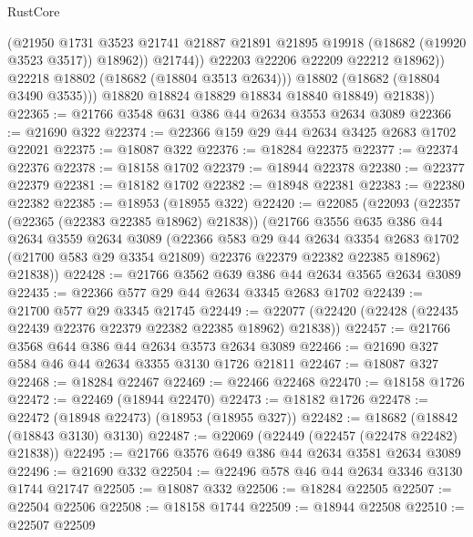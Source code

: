 \begin{lexlean}{RustCore}
\begin{coremodule}
                        (@21950
                          @1731
                          @3523
                          @21741
                          @21887
                          @21891
                          @21895
                          @19918
                          (@18682 (@19920 @3523 @3517))
                          @18962))
                      @21744))
                  @22203
                  @22206
                  @22209
                  @22212
                  @18962))
              @22218
              @18802
              (@18682 (@18804 @3513 @2634)))
            @18802
            (@18682 (@18804 @3490 @3535)))
          @18820
          @18824
          @18829
          @18834
          @18840
          @18849)
        @21838))
@22365 := @21766 @3548 @631 @386 @44 @2634 @3553 @2634 @3089
@22366 := @21690 @322
@22374 := @22366 @159 @29 @44 @2634 @3425 @2683 @1702 @22021
@22375 := @18087 @322
@22376 := @18284 @22375
@22377 := @22374 @22376
@22378 := @18158 @1702
@22379 := @18944 @22378
@22380 := @22377 @22379
@22381 := @18182 @1702
@22382 := @18948 @22381
@22383 := @22380 @22382
@22385 := @18953 (@18955 @322)
@22420 := @22085
    (@22093
      (@22357 (@22365 (@22383 @22385 @18962) @21838))
      (@21766
        @3556
        @635
        @386
        @44
        @2634
        @3559
        @2634
        @3089
        (@22366
          @583
          @29
          @44
          @2634
          @3354
          @2683
          @1702
          (@21700 @583 @29 @3354 @21809)
          @22376
          @22379
          @22382
          @22385
          @18962)
        @21838))
@22428 := @21766 @3562 @639 @386 @44 @2634 @3565 @2634 @3089
@22435 := @22366 @577 @29 @44 @2634 @3345 @2683 @1702
@22439 := @21700 @577 @29 @3345 @21745
@22449 := @22077 (@22420 (@22428 (@22435 @22439 @22376 @22379 @22382 @22385 @18962) @21838))
@22457 := @21766 @3568 @644 @386 @44 @2634 @3573 @2634 @3089
@22466 := @21690 @327 @584 @46 @44 @2634 @3355 @3130 @1726 @21811
@22467 := @18087 @327
@22468 := @18284 @22467
@22469 := @22466 @22468
@22470 := @18158 @1726
@22472 := @22469 (@18944 @22470)
@22473 := @18182 @1726
@22478 := @22472 (@18948 @22473) (@18953 (@18955 @327))
@22482 := @18682 (@18842 (@18843 @3130) @3130)
@22487 := @22069 (@22449 (@22457 (@22478 @22482) @21838))
@22495 := @21766 @3576 @649 @386 @44 @2634 @3581 @2634 @3089
@22496 := @21690 @332
@22504 := @22496 @578 @46 @44 @2634 @3346 @3130 @1744 @21747
@22505 := @18087 @332
@22506 := @18284 @22505
@22507 := @22504 @22506
@22508 := @18158 @1744
@22509 := @18944 @22508
@22510 := @22507 @22509

\end{coremodule}
\end{lexlean}
